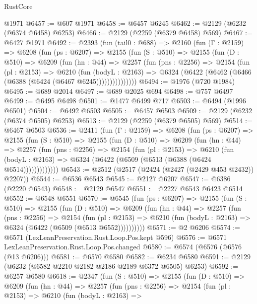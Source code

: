 \begin{lexlean}{RustCore}
\begin{coremodule}
    @1971
@6457 := @607 @1971
@6458 := @6457 @6245
@6462 := @2129 (@6232 (@6374 @6458) @6253)
@6466 := @2129 (@2259 (@6379 @6458) @569)
@6467 := @6427 @1971
@6492 := @2393
    (fun (tail0 : @688) =>
    @2160
      (fun (Γ : @2159) =>
      @6208
        (fun (ps : @6207) =>
        @2155
          (fun (S : @510) =>
          @2155
            (fun (D : @510) =>
            @6209
              (fun (hn : @44) =>
              @2257
                (fun (pns : @2256) =>
                @2154
                  (fun (pl : @2153) =>
                  @6210
                    (fun (bodyL : @2163) =>
                    @6324 (@6422 (@6462 (@6466 (@6388 (@6424 (@6467 @6245)))))))))))))))
@6494 := @1976 (@720 @1984)
@6495 := @689 @2014
@6497 := @689 @2025 @694
@6498 := @757 @6497
@6499 := @6495 @6498
@6501 := @1477 @6499 @717
@6503 := @6494 (@1996 @6501)
@6504 := @6492 @6503
@6505 := @6457 @6503
@6509 := @2129 (@6232 (@6374 @6505) @6253)
@6513 := @2129 (@2259 (@6379 @6505) @569)
@6514 := @6467 @6503
@6536 := @2411
    (fun (Γ : @2159) =>
    @6208
      (fun (ps : @6207) =>
      @2155
        (fun (S : @510) =>
        @2155
          (fun (D : @510) =>
          @6209
            (fun (hn : @44) =>
            @2257
              (fun (pns : @2256) =>
              @2154
                (fun (pl : @2153) =>
                @6210
                  (fun (bodyL : @2163) =>
                  @6324 (@6422 (@6509 (@6513 (@6388 (@6424 @6514)))))))))))))
@6543 := @2512 (@2517 (@2424 (@2427 (@2429 @453 @2432)) @2207))
@6544 := @6536 @6543
@6545 := @2127 @6207
@6547 := @6386 (@2220 @6543)
@6548 := @2129 @6547
@6551 := @2227 @6543 @6423 @6514
@6552 := @6548 @6551
@6570 := @6545
    (fun (ps : @6207) =>
    @2155
      (fun (S : @510) =>
      @2155
        (fun (D : @510) =>
        @6209
          (fun (hn : @44) =>
          @2257
            (fun (pns : @2256) =>
            @2154
              (fun (pl : @2153) =>
              @6210 (fun (bodyL : @2163) => @6324 (@6422 (@6509 (@6513 @6552))))))))))
@6571 := @2 @6206
@6574 := @6571 (LexLeanPreservation.Rust.Loop.Pos.kept @596)
@6576 := @6571 LexLeanPreservation.Rust.Loop.Pos.changed
@6580 := @6574 (@6576 (@6576 (@13 @6206)))
@6581 := @6570 @6580
@6582 := @6234 @6580
@6591 := @2129 (@6232 (@6582 @2210 @2182 @2186 @2189 @6372 @6505) @6253)
@6592 := @6257 @6580
@6618 := @2347
    (fun (S : @510) =>
    @2155
      (fun (D : @510) =>
      @6209
        (fun (hn : @44) =>
        @2257
          (fun (pns : @2256) =>
          @2154
            (fun (pl : @2153) =>
            @6210
              (fun (bodyL : @2163) =>

\end{coremodule}
\end{lexlean}

